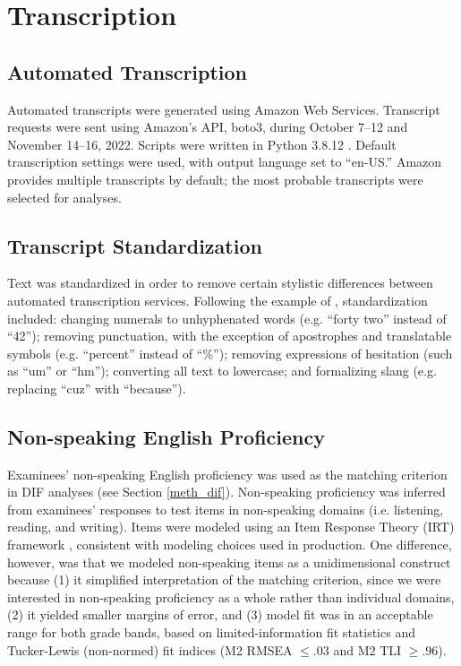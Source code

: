 \documentclass [PhD] {uclathes}
\begin{document}
\section{Transcription}

\subsection{Automated Transcription}
\label{meth_auto_transcribe}

Automated transcripts were generated using Amazon Web Services. Transcript requests were sent using Amazon’s API, boto3, during October 7–12 and November 14–16, 2022. Scripts were written in Python 3.8.12 \citep{python2022}. Default transcription settings were used, with output language set to “en-US.” Amazon provides multiple transcripts by default; the most probable transcripts were selected for analyses.

\subsection{Transcript Standardization}
\label{sec:meth_text_standardization}

Text was standardized in order to remove certain stylistic differences between automated transcription services. Following the example of \cite{koenecke2020}, standardization included: changing numerals to unhyphenated words (e.g. “forty two” instead of “42”); removing punctuation, with the exception of apostrophes and translatable symbols (e.g. “percent” instead of “\%”); removing expressions of hesitation (such as “um” or “hm”); converting all text to lowercase; and formalizing slang (e.g. replacing “cuz” with “because”).

\subsection{Non-speaking English Proficiency}
\label{meth_nonspeaking}

Examinees' non-speaking English proficiency was used as the matching criterion in DIF analyses (see Section \ref {meth_dif}). Non-speaking proficiency was inferred from examinees' responses to test items in non-speaking domains (i.e. listening, reading, and writing). Items were modeled using an Item Response Theory (IRT) framework \citep{cai_item_2016}, consistent with modeling choices used in production. One difference, however, was that we modeled non-speaking items as a unidimensional construct because (1) it simplified interpretation of the matching criterion, since we were interested in non-speaking proficiency as a whole rather than individual domains, (2) it yielded smaller margins of error, and (3) model fit was in an acceptable range for both grade bands, based on limited-information fit statistics and Tucker-Lewis (non-normed) fit indices (M2 RMSEA $\leq .03$ and M2 TLI $\geq .96$). 
\end{document}
